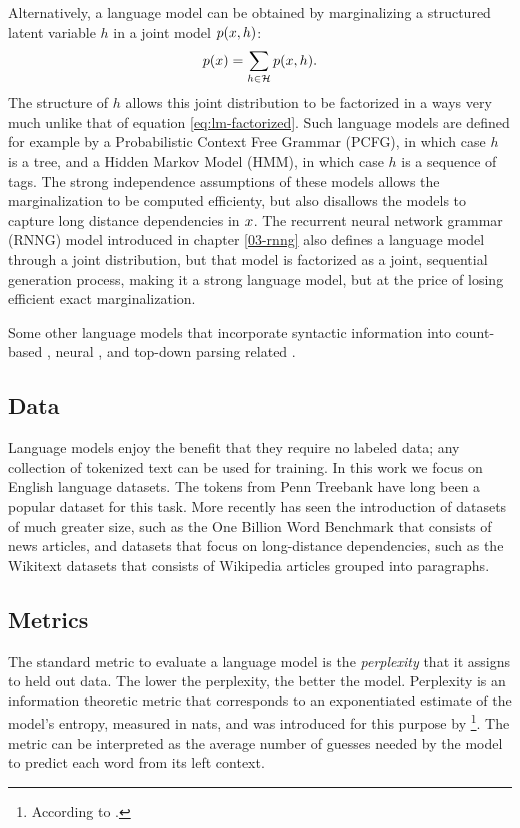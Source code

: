     Alternatively, a language model can be obtained by marginalizing a structured latent variable $h$ in a joint model $p(x, h)$:
    \begin{align}
      \label{eq:lm-latent}
      p( x ) = \sum_{h \in \mathcal{H}} p(x, h).
    \end{align}
    The structure of $h$ allows this joint distribution to be factorized in a ways very much unlike that of equation \ref{eq:lm-factorized}. Such language models are defined for example by a Probabilistic Context Free Grammar (PCFG), in which case $h$ is a tree, and a Hidden Markov Model (HMM), in which case $h$ is a sequence of tags. The strong independence assumptions of these models allows the marginalization to be computed efficienty, but also disallows the models to capture long distance dependencies in $x$. The recurrent neural network grammar (RNNG) model introduced in chapter \ref{03-rnng} also defines a language model through a joint distribution, but that model is factorized as a joint, sequential generation process, making it a strong language model, but at the price of losing efficient exact marginalization.

    Some other language models that incorporate syntactic information into count-based \citep{chelba2000structured,pauls2012treelets}, neural \citep{emami2005neural}, and top-down parsing related \citep{roark2001probabilistic}.

  \subsection{Data}
    Language models enjoy the benefit that they require no labeled data; any collection of tokenized text can be used for training. In this work we focus on English language datasets. The tokens from Penn Treebank have long been a popular dataset for this task. More recently has seen the introduction of datasets of much greater size, such as the One Billion Word Benchmark \citep{chelba2013one} that consists of news articles, and datasets that focus on long-distance dependencies, such as the Wikitext datasets \citep{merity2016pointer} that consists of Wikipedia articles grouped into paragraphs.

  \subsection{Metrics}
    The standard metric to evaluate a language model is the \textit{perplexity} that it assigns to held out data. The lower the perplexity, the better the model. Perplexity is an information theoretic metric that corresponds to an exponentiated estimate of the model's entropy, measured in nats, and was introduced for this purpose by \citet{jelinek1997information}\footnote{According to \citep{chelba2017n}.}. The metric can be interpreted as the average number of guesses needed by the model to predict each word from its left context.

